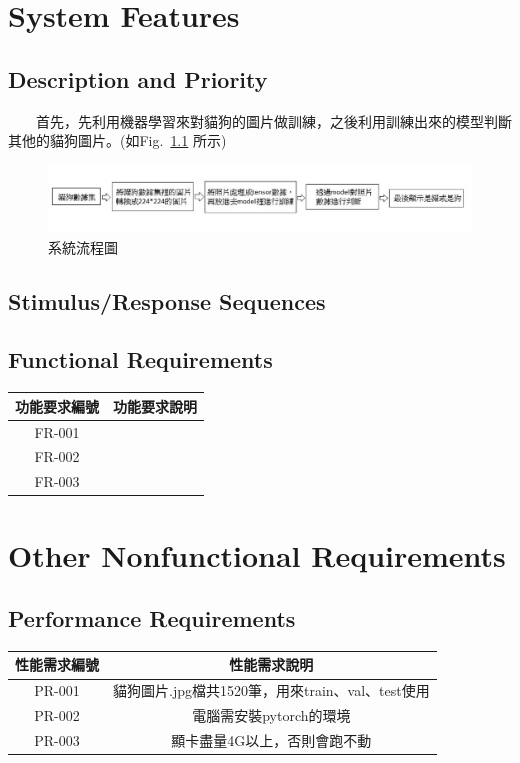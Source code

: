 \documentclass{scrreprt}
\begin{document}
\begin{CJK*}{UTF8}{bsmi}
\chapter{System Features}

\section{Description and Priority}
　　首先，先利用機器學習來對貓狗的圖片做訓練，之後利用訓練出來的模型判斷其他的貓狗圖片。(如Fig. \,\ref{fig:4.1} 所示)\\
\begin{figure}[h]
\begin{center}
\includegraphics[width=18cm]{process.jpg} 
\end{center} 
\label{fig:4.1} 
\caption{系統流程圖} 
\end{figure}
\section{Stimulus/Response Sequences}


\section{Functional Requirements}
\begin{center}
    \begin{tabular}{|c|c|}
        \hline
	    功能要求編號 & 功能要求說明 \\
        \hline
	    FR-001 & \\ 
        \hline
	    FR-002 & \\
        \hline
	    FR-003 & \\
        \hline
    \end{tabular}
\end{center}



\chapter{Other Nonfunctional Requirements}

\section{Performance Requirements}
\begin{center}
    \begin{tabular}{|c|c|}
        \hline
	    性能需求編號 & 性能需求說明 \\
        \hline
	    PR-001 & 貓狗圖片.jpg檔共1520筆，用來train、val、test使用\\
        \hline
	    PR-002 & 電腦需安裝pytorch的環境\\
        \hline
	    PR-003 & 顯卡盡量4G以上，否則會跑不動\\
        \hline
    \end{tabular}
\end{center}


\end{CJK*}
\end{document}
